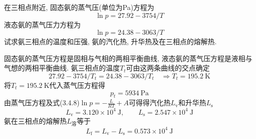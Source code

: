 \begin{problem}[3.8]
在三相点附近, 固态氨的蒸气压(单位为Pa)方程为
\[
\ln p = 27.92 - 3754/T
\]
液态氨的蒸气压力方程为
\[
\ln p = 24.38 - 3063/T
\]
试求氨三相点的温度和压强, 氨的汽化热, 升华热及在三相点的熔解热.
\end{problem}
\begin{solution}
固态氨的蒸气压方程是固相与气相的两相平衡曲线, 液态氨的蒸气压方程是液相与气想的两相平衡曲线. 氨三相点的温度$T_t$可由这两条曲线的交点确定
\[
27.92 - 3754/T_t = 24.38 - 3063/T_t \quad\Longrightarrow
T_t = 195.2 ~\mathrm{K}
\]
将$T_t = 195.2 ~\mathrm{K}$代入蒸气压方程得
\[
p_t = 5934 ~\mathrm{Pa}
\]
由蒸气压方程及式(3.4.8)$\ln p = -\frac{L}{RT}+A$可得得汽化热$L_\text{v}$和升华热$L_\text{s}$
\[
L_\text{v} = 3.120\times 10^4 ~\mathrm{J}, \qquad
L_\text{s} = 2.547\times 10^4 ~\mathrm{J}
\]
氨在三相点的熔解热$L_{溶}$等于
\[
L_\text{f} = L_\text{v}- L_\text{s} = 0.573\times 10^4 ~\mathrm{J}
\]
\end{solution}
